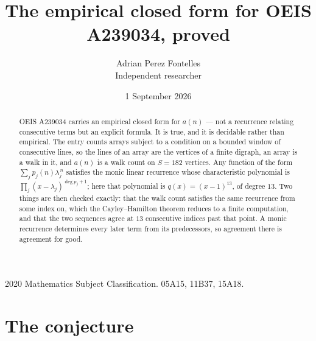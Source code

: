 \documentclass[11pt,a4paper]{article}
\title{The empirical closed form for OEIS A239034, proved}
\author{Adrian Perez Fontelles\\ \small Independent researcher}
\date{1 September 2026}
\theoremstyle{plain}
\theoremstyle{definition}
\begin{document}
\maketitle

\begin{abstract}
OEIS A239034 carries an empirical closed form for $a(n)$ --- not a recurrence relating
consecutive terms but an explicit formula. It is true, and it is decidable rather than
empirical. The entry counts arrays subject to a condition on a bounded window of consecutive lines, so the lines of an array are the
vertices of a finite digraph, an array is a walk in it, and $a(n)$ is a walk count on
$S=182$ vertices. Any function of the form $\sum_j p_j(n)\lambda_j^{\,n}$ satisfies the
monic linear recurrence whose characteristic polynomial is
$\prod_j(x-\lambda_j)^{\deg p_j+1}$; here that polynomial is $q(x)=(x-1)^{13}$, of degree
$13$. Two things are then checked exactly: that the walk count satisfies the same
recurrence from some index on, which the Cayley--Hamilton theorem reduces to a finite
computation, and that the two sequences agree at $13$ consecutive indices past that
point. A monic recurrence determines every later term from its predecessors, so agreement
there is agreement for good.
\end{abstract}

\noindent\small 2020 Mathematics Subject Classification. 05A15, 11B37, 15A18.\normalsize

\section{The conjecture}
\end{document}

